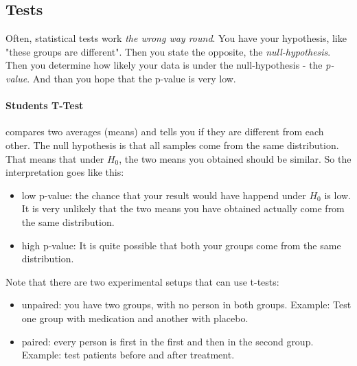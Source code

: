 \subsection{Tests}
Often, statistical tests work \emph{the wrong way round}. You have your hypothesis, like "these groups are different". Then you state the opposite, the \emph{null-hypothesis}. Then you determine how likely your data is under the null-hypothesis - the \emph{p-value}. And than you hope that the p-value is very low.

\paragraph{Students T-Test} compares two averages (means) and tells you if they are different from each other. The null hypothesis is that all samples come from the same distribution. That means that under $H_0$, the two means you obtained should be similar. So the interpretation goes like this: 
\begin{itemize}
    \item low p-value: the chance that your result would have happend under $H_0$ is low. It is very unlikely that the two means you have obtained actually come from the same distribution. 
    \item high p-value: It is quite possible that both your groups come from the same distribution. 
\end{itemize}
Note that there are two experimental setups that can use t-tests:
\begin{itemize}
    \item unpaired: you have two groups, with no person in both groups. Example: Test one group with medication and another with placebo. 
    \item paired: every person is first in the first and then in the second group. Example: test patients before and after treatment. 
\end{itemize}
